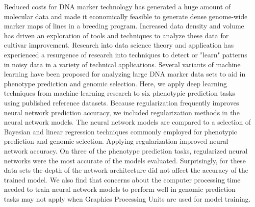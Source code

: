 

Reduced costs for DNA marker technology has generated a huge amount of
molecular data and made it economically feasible to generate dense genome-wide
marker maps of lines in a breeding program. Increased data density and volume
has driven an exploration of tools and techniques to analyze these data for
cultivar improvement. Research into data science theory and application has experienced
a resurgence of research into techniques to detect or "learn" patterns in noisy
data in a variety of technical applications. Several variants of machine learning have been proposed
for analyzing large DNA marker data sets to aid in phenotype prediction and genomic selection.
Here, we apply deep learning techniques from machine learning research to six 
phenotypic prediction tasks using published reference datasets. Because regularization
frequently improves neural network prediction accuracy, we included regularization
methods in the neural network models.
The neural network models are compared to a selection of Bayesian and 
linear regression techniques commonly employed for phenotypic prediction and
genomic selection. Applying regularization improved neural network
accuracy. On three of the phenotype prediction tasks, regularized neural networks 
were the most accurate of the models evaluated. Surprisingly, for these data sets
the depth of the network architecture did not affect the accuracy of the trained 
model. We also find that concerns about the computer processing
time needed to train neural network models to perform well in genomic prediction 
tasks may not apply when Graphics Processing Units are used for model training.


%


